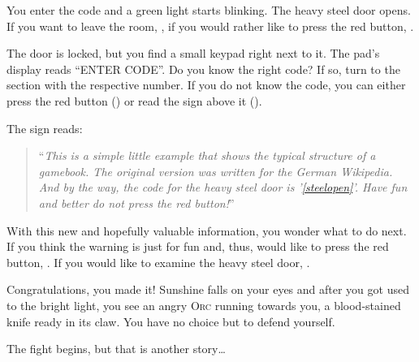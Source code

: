 \documentclass[10pt,twoside]{article}
\begin{document}
	
	You enter the code and a green light starts blinking. The heavy steel door opens. If you want to leave the room, , if you would rather like to press the red button, .
	
	
	The door is locked, but you find a small keypad right next to it. The pad's display reads ``ENTER CODE''. Do you know the right code? If so, turn to the section with the respective number. If you do not know the code, you can either press the red button () or read the sign above it ().
	
	
	The sign reads: 
\begin{quote}
	``\emph{This is a simple little example that shows the typical structure of a gamebook. The original version was written for the German Wikipedia. And by the way, the code for the heavy steel door is '\ref{steelopen}'. Have fun and better do not press the red button!}''
\end{quote}
	
	With this new and hopefully valuable information, you wonder what to do next. If you think the warning is just for fun and, thus, would like to press the red button, . If you would like to examine the heavy steel door, .
	
	
	Congratulations, you made it! Sunshine falls on your eyes and after you got used to the bright light, you see an angry \textsc{Orc} running towards you, a blood-stained knife ready in its claw. You have no choice but to defend yourself.
	
	The fight begins, but that is another story\dots
\end{document}
